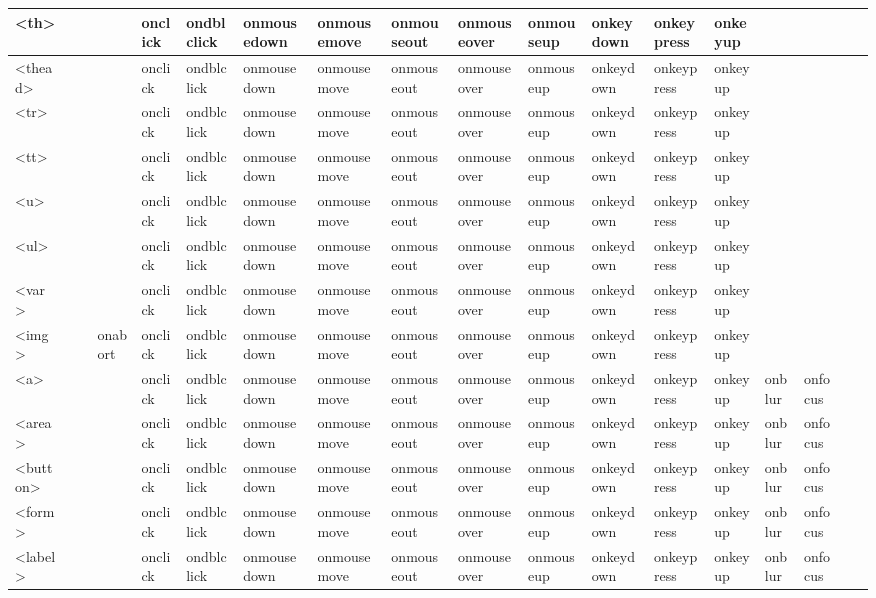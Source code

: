 \begin{longtable}{|p{18pt}|p{15pt}|p{15pt}|p{10pt}|p{16pt}|p{16pt}|p{16pt}|p{16pt}|p{16pt}|p{16pt}|p{16pt}|p{16pt}|p{16pt}|p{16pt}|p{16pt}|p{16pt}|p{16pt}|p{16pt}|}
\hline
<th>			&	&	&	& onclick	& ondblclick & onmousedown & onmousemove & onmouseout & onmouseover & onmouseup & onkeydown & onkeypress & onkeyup & & & & \\
\hline
<thead>		&	&	&	& onclick	& ondblclick & onmousedown & onmousemove & onmouseout & onmouseover & onmouseup & onkeydown & onkeypress & onkeyup & & & & \\
\hline
<tr>			&	&	&	& onclick	& ondblclick & onmousedown & onmousemove & onmouseout & onmouseover & onmouseup & onkeydown & onkeypress & onkeyup & & & & \\
\hline
<tt>			&	&	&	& onclick	& ondblclick & onmousedown & onmousemove & onmouseout & onmouseover & onmouseup & onkeydown & onkeypress & onkeyup & & & & \\
\hline
<u>			&	&	&	& onclick	& ondblclick & onmousedown & onmousemove & onmouseout & onmouseover & onmouseup & onkeydown & onkeypress & onkeyup & & & & \\
\hline
<ul>			&	&	&	& onclick	& ondblclick & onmousedown & onmousemove & onmouseout & onmouseover & onmouseup & onkeydown & onkeypress & onkeyup & & & & \\
\hline
<var>		&	&	&	& onclick	& ondblclick & onmousedown & onmousemove & onmouseout & onmouseover & onmouseup & onkeydown & onkeypress & onkeyup & & & & \\
\hline
<img>		&	&	&onabort	& onclick	& ondblclick & onmousedown & onmousemove & onmouseout & onmouseover & onmouseup & onkeydown & onkeypress & onkeyup & & & & \\
\hline
<a>			&	&	&	& onclick	& ondblclick & onmousedown & onmousemove & onmouseout & onmouseover & onmouseup & onkeydown & onkeypress & onkeyup &onblur &onfocus & & \\				
\hline
<area>		&	&	&	& onclick	& ondblclick & onmousedown & onmousemove & onmouseout & onmouseover & onmouseup & onkeydown & onkeypress & onkeyup &onblur &onfocus & & \\				
\hline
<button>		&	&	&	& onclick	& ondblclick & onmousedown & onmousemove & onmouseout & onmouseover & onmouseup & onkeydown & onkeypress & onkeyup &onblur &onfocus & & \\				
\hline
<form>		&	&	&	& onclick	& ondblclick & onmousedown & onmousemove & onmouseout & onmouseover & onmouseup & onkeydown & onkeypress & onkeyup &onblur &onfocus & & \\				
\hline
<label>		&	&	&	& onclick	& ondblclick & onmousedown & onmousemove & onmouseout & onmouseover & onmouseup & onkeydown & onkeypress & onkeyup &onblur &onfocus & & \\				

\end{longtable}
